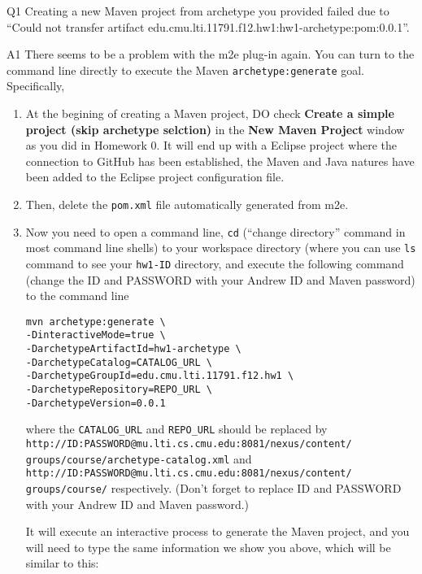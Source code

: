 \begin{qa}

\item[Q1] Creating a new Maven project from archetype you provided failed due to
``Could not transfer artifact
edu.cmu.lti.11791.f12.hw1:hw1-archetype:pom:0.0.1''.

\item[A1] There seems to be a problem with the m2e plug-in again. You can turn
to the command line directly to execute the Maven \texttt{archetype:generate}
goal. Specifically,

\begin{enumerate}

\item At the begining of creating a Maven project, DO check
\textbf{Create a simple project (skip archetype selction)} in the \textbf{New Maven Project}
window as you did in Homework 0. It will end up with a Eclipse project where the
connection to GitHub has been established, the Maven and Java natures have been
added to the Eclipse project configuration file.

\item Then, delete the \verb|pom.xml| file automatically generated from m2e.

\item Now you need to open a command line, \verb|cd| (``change directory'' command in
most command line shells) to your workspace directory (where you can use
\verb|ls| command to see your \verb|hw1-ID| directory, and execute the following
command (change the ID and PASSWORD with your Andrew ID and Maven password) to
the command line

\small
\begin{verbatim}
mvn archetype:generate \
-DinteractiveMode=true \
-DarchetypeArtifactId=hw1-archetype \
-DarchetypeCatalog=CATALOG_URL \
-DarchetypeGroupId=edu.cmu.lti.11791.f12.hw1 \
-DarchetypeRepository=REPO_URL \
-DarchetypeVersion=0.0.1
\end{verbatim}
\normalsize

where the \verb|CATALOG_URL| and \verb|REPO_URL| should be replaced by
\verb|http://ID:PASSWORD@mu.lti.cs.cmu.edu:8081/nexus/content/|
\verb|groups/course/archetype-catalog.xml| and
\verb|http://ID:PASSWORD@mu.lti.cs.cmu.edu:8081/nexus/content/|
\verb|groups/course/| respectively. (Don't forget to replace ID and PASSWORD
with your Andrew ID and Maven password.)

It will execute an interactive process to generate the Maven project, and you
will need to type the same information we show you above, which will be similar
to this:


\end{enumerate}
\end{qa}
